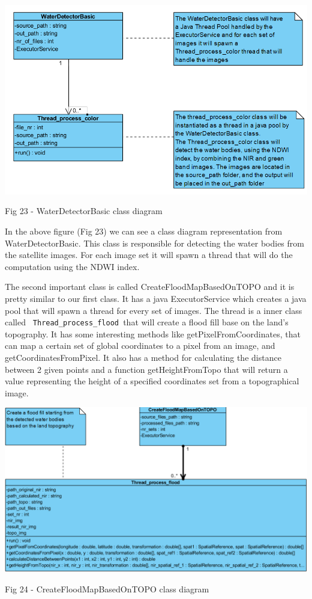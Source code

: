 \documentclass[12pt, a4paper]{report}
\begin{document}
\medskip
\includegraphics[scale=0.6, center]{WaterDetectorBasic_class.png}
\begin{center}
Fig 23 - WaterDetectorBasic class diagram
\end{center}
\par 

In the above figure (Fig 23) we can see a class diagram representation from WaterDetectorBasic. This class is responsible for detecting the water bodies from the satellite images. For each image set it will spawn a thread that will do the computation using the NDWI index.
\par 

The second important class is called CreateFloodMapBasedOnTOPO and it is pretty similar to our first class. It has a java ExecutorService which creates a java pool that will spawn a thread for every set of images. The thread is a inner class called \texttt{ Thread\_process\_flood }that will create a flood fill base on the land's topography. It has some interesting methods like getPixelFromCoordinates, that can map a certain set of global coordinates to a pixel from an image, and getCoordinatesFromPixel. It also has a method for calculating the distance between 2 given points and a function getHeightFromTopo that will return a value representing the height of a specified coordinates set from a topographical image.

\bigskip
\includegraphics[scale=0.55, center]{CreateFloodMapBasedOnTOPO_class.png}
\begin{center}
Fig 24 - CreateFloodMapBasedOnTOPO class diagram
\end{center}
\par 
\end{document}

